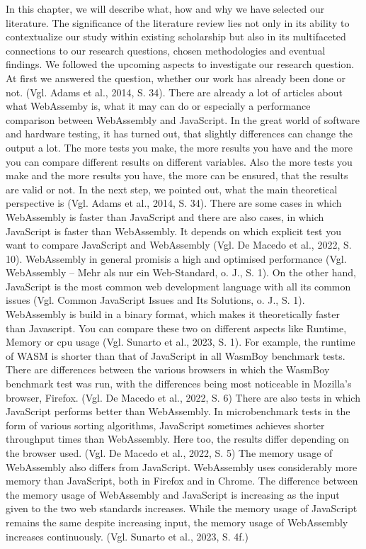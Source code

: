 In this chapter, we will describe what, how and why we have selected our literature. 
The significance of the literature review lies not only in its ability to contextualize our study within existing scholarship but also in its multifaceted connections to our research questions, chosen methodologies and eventual findings. We followed the upcoming aspects to investigate our research question. 
At first we answered the question, whether our work has already been done or not. (Vgl. Adams et al., 2014, S. 34). There are already a lot of articles about what WebAssemby is, what it may can do or especially a performance comparison between WebAssembly and JavaScript. In the great world of software and hardware testing, it has turned out, that slightly differences can change the output a lot. The more tests you make, the more results you have and the more you can compare different results on different variables. Also the more tests you make and the more results you have, the more can be ensured, that the results are valid or not.
In the next step, we pointed out, what the main theoretical perspective is (Vgl. Adams et al., 2014, S. 34). There are some cases in which WebAssembly is faster than JavaScript and there are also cases, in which JavaScript is faster than WebAssembly. It depends on which explicit test you want to compare JavaScript and WebAssembly (Vgl. De Macedo et al., 2022, S. 10). WebAssembly in general promisis a high and optimised performance (Vgl. WebAssembly – Mehr als nur ein Web-Standard, o. J., S. 1). On the other hand, JavaScript is the most common web development language with all its common issues (Vgl. Common JavaScript Issues and Its Solutions, o. J., S. 1). WebAssembly is build in a binary format, which makes it theoretically faster than Javascript. You can compare these two  on different aspects like Runtime, Memory or cpu usage (Vgl. Sunarto et al., 2023, S. 1). For example, the runtime of WASM is shorter than that of JavaScript in all WasmBoy benchmark tests. There are differences between the various browsers in which the WasmBoy benchmark test was run, with the differences being most noticeable in Mozilla's browser, Firefox. (Vgl. De Macedo et al., 2022, S. 6) There are also tests in which JavaScript performs better than WebAssembly. In microbenchmark tests in the form of various sorting algorithms, JavaScript sometimes achieves shorter throughput times than WebAssembly. Here too, the results differ depending on the browser used. (Vgl. De Macedo et al., 2022, S. 5) The memory usage of WebAssembly also differs from JavaScript. WebAssembly uses considerably more memory than JavaScript, both in Firefox and in Chrome. The difference between the memory usage of WebAssembly and JavaScript is increasing as the input given to the two web standards increases. While the memory usage of JavaScript remains the same despite increasing input, the memory usage of WebAssembly increases continuously. (Vgl. Sunarto et al., 2023, S. 4f.)
